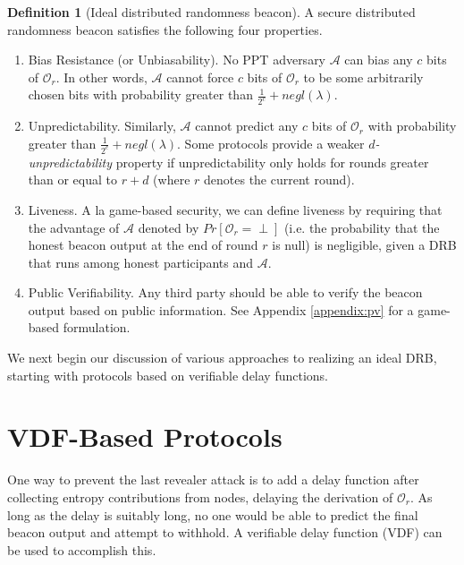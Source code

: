 \documentclass[conference]{IEEEtran}
\theoremstyle{definition}
\newtheorem{definition}[theorem]{Definition}
\theoremstyle{remark}
\begin{document}
\begin{definition}[Ideal distributed randomness beacon]
A secure distributed randomness beacon satisfies the following four properties.
\begin{enumerate}
\item Bias Resistance (or Unbiasability). No PPT adversary $\mathcal{A}$ can bias any $c$ bits of $\mathcal{O}_r$. In other words, $\mathcal{A}$ cannot force $c$ bits of $\mathcal{O}_r$ to be some arbitrarily chosen bits with probability greater than $\frac{1}{2^c} + negl(\lambda)$.
\item Unpredictability. Similarly, $\mathcal{A}$ cannot predict any $c$ bits of $\mathcal{O}_r$ with probability greater than $\frac{1}{2^c} + negl(\lambda)$. Some protocols provide a weaker \textit{$d$-unpredictability} \cite{bhat2020randpiper} property
if unpredictability only holds for rounds greater than or equal to $r + d$ (where $r$ denotes the current round).
\item Liveness. A la game-based security, we can define liveness \cite{guo2020secRand} by requiring that the advantage of $\mathcal{A}$ denoted by $Pr[\mathcal{O}_r = \text{$\perp$}]$ (i.e. the probability that the honest beacon output at the end of round $r$ is null) is negligible, given a DRB that runs among honest participants and $\mathcal{A}$.
\item Public Verifiability. Any third party should be able to verify the beacon output based on public information. See Appendix \ref{appendix:pv} for a game-based formulation.
\end{enumerate}
\end{definition}

We next begin our discussion of various approaches to realizing an ideal DRB, starting with protocols based on verifiable delay functions.

\section{VDF-Based Protocols}
\label{section:vdf}
One way to prevent the last revealer attack is to add a delay function after collecting entropy contributions from nodes, delaying the derivation of $\mathcal{O}_r$. As long as the delay is suitably long, no one would be able to predict the final beacon output and attempt to withhold. A verifiable delay function (VDF) \cite{boneh2018verifiable,boneh2018survey} can be used to accomplish this.
\end{document}
